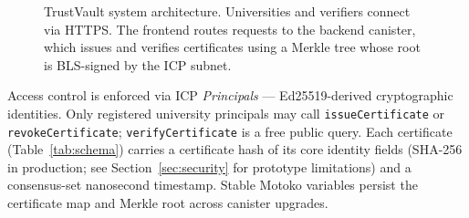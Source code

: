 \documentclass[conference,a4paper]{IEEEtran}
\begin{document}
\begin{figure}[t]
\caption{TrustVault system architecture. Universities and verifiers connect via HTTPS. The frontend routes requests to the backend canister, which issues and verifies certificates using a Merkle tree whose root is BLS-signed by the ICP subnet.}
\label{fig:sysarch}
\end{figure}

Access control is enforced via ICP \textit{Principals} — Ed25519-derived cryptographic identities. Only registered university principals may call \texttt{issueCertificate} or \texttt{revokeCertificate}; \texttt{verifyCertificate} is a free public query. Each certificate (Table~\ref{tab:schema}) carries a certificate hash of its core identity fields (SHA-256 in production; see Section~\ref{sec:security} for prototype limitations) and a consensus-set nanosecond timestamp. Stable Motoko variables persist the certificate map and Merkle root across canister upgrades.
\end{document}
